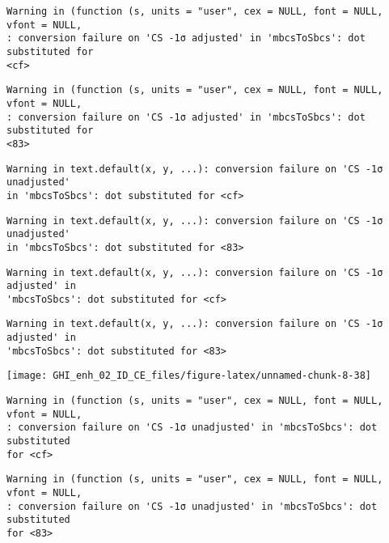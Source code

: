 \documentclass[
  10pt,
  a4paper,oneside]{article}
\begin{document}
\begin{verbatim}
Warning in (function (s, units = "user", cex = NULL, font = NULL, vfont = NULL,
: conversion failure on 'CS -1σ adjusted' in 'mbcsToSbcs': dot substituted for
<cf>
\end{verbatim}

\begin{verbatim}
Warning in (function (s, units = "user", cex = NULL, font = NULL, vfont = NULL,
: conversion failure on 'CS -1σ adjusted' in 'mbcsToSbcs': dot substituted for
<83>
\end{verbatim}

\begin{verbatim}
Warning in text.default(x, y, ...): conversion failure on 'CS -1σ unadjusted'
in 'mbcsToSbcs': dot substituted for <cf>
\end{verbatim}

\begin{verbatim}
Warning in text.default(x, y, ...): conversion failure on 'CS -1σ unadjusted'
in 'mbcsToSbcs': dot substituted for <83>
\end{verbatim}

\begin{verbatim}
Warning in text.default(x, y, ...): conversion failure on 'CS -1σ adjusted' in
'mbcsToSbcs': dot substituted for <cf>
\end{verbatim}

\begin{verbatim}
Warning in text.default(x, y, ...): conversion failure on 'CS -1σ adjusted' in
'mbcsToSbcs': dot substituted for <83>
\end{verbatim}

\begin{center}\texttt{[image: GHI\_enh\_02\_ID\_CE\_files/figure-latex/unnamed-chunk-8-38]} \end{center}

\begin{verbatim}
Warning in (function (s, units = "user", cex = NULL, font = NULL, vfont = NULL,
: conversion failure on 'CS -1σ unadjusted' in 'mbcsToSbcs': dot substituted
for <cf>
\end{verbatim}

\begin{verbatim}
Warning in (function (s, units = "user", cex = NULL, font = NULL, vfont = NULL,
: conversion failure on 'CS -1σ unadjusted' in 'mbcsToSbcs': dot substituted
for <83>
\end{verbatim}
\end{document}
